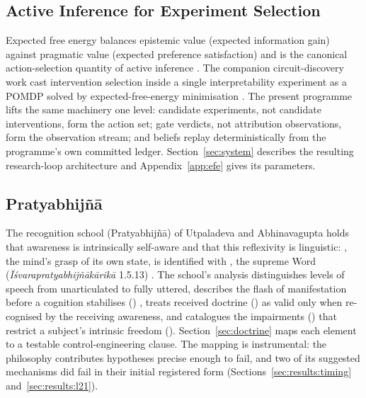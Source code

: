 \subsection{Active Inference for Experiment Selection}

Expected free energy balances epistemic value (expected information gain) against pragmatic value (expected preference satisfaction) and is the canonical action-selection quantity of active inference \cite{Friston2010,Friston2015,DaCosta2020,Parr2022}. The companion circuit-discovery work cast intervention selection inside a single interpretability experiment as a POMDP solved by expected-free-energy minimisation \cite{Sathish2026ACD}. The present programme lifts the same machinery one level: candidate experiments, not candidate interventions, form the action set; gate verdicts, not attribution observations, form the observation stream; and beliefs replay deterministically from the programme's own committed ledger. Section~\ref{sec:system} describes the resulting research-loop architecture and Appendix~\ref{app:efe} gives its parameters.

\subsection{Pratyabhij\~n\=a}

The recognition school (Pratyabhij\~n\=a) of Utpaladeva and Abhinavagupta holds that awareness is intrinsically self-aware and that this reflexivity is linguistic: , the mind's grasp of its own state, is identified with , the supreme Word (\emph{\={I}\'svarapratyabhij\~n\=ak\=arik\=a} 1.5.13) \cite{Torella2002}. The school's analysis distinguishes levels of speech from unarticulated to fully uttered, describes the flash of manifestation before a cognition stabilises () \cite{Dyczkowski1992}, treats received doctrine () as valid only when re-cognised by the receiving awareness, and catalogues the impairments () that restrict a subject's intrinsic freedom (). Section~\ref{sec:doctrine} maps each element to a testable control-engineering clause. The mapping is instrumental: the philosophy contributes hypotheses precise enough to fail, and two of its suggested mechanisms did fail in their initial registered form (Sections~\ref{sec:results:timing} and~\ref{sec:results:l21}).
